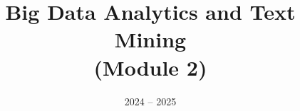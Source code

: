 \documentclass[11pt]{ainotes}
\title{Big Data Analytics and Text Mining\\(Module 2)}
\date{2024 -- 2025}
\begin{document}
    \makenotesfront
\end{document}

